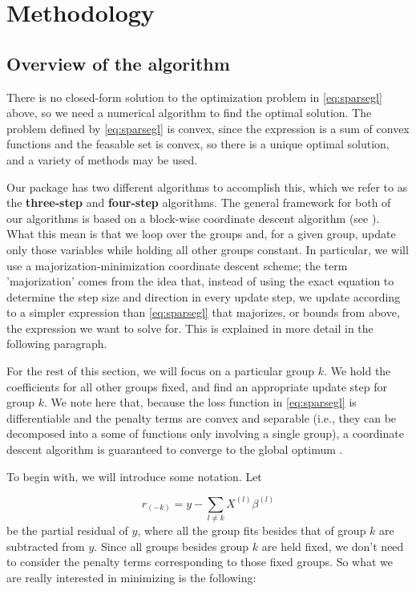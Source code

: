 \documentclass[titlepage]{article}
\begin{document}
\section{Methodology}
\label{Sec:meth}

\subsection{Overview of the algorithm}

There is no closed-form solution to the optimization problem in \autoref{eq:sparsegl} above, so we need a numerical algorithm to find the optimal solution. The problem defined by \autoref{eq:sparsegl} is convex, since the expression is a sum of convex functions and the feasable set is convex, so there is a unique optimal solution, and a variety of methods may be used.

Our package has two different algorithms to accomplish this, which we refer to as the \textbf{three-step} and \textbf{four-step} algorithms. The general framework for both of our algorithms is based on a block-wise coordinate descent algorithm (see \citep{yang2015fast, simon2013sparse}). What this mean is that we loop over the groups and, for a given group, update only those variables while holding all other groups constant. In particular, we will use a majorization-minimization coordinate descent scheme; the term 'majorization' comes from the idea that, instead of using the exact equation to determine the step size and direction in every update step, we update according to a simpler expression than \autoref{eq:sparsegl} that majorizes, or bounds from above, the expression we want to solve for. This is explained in more detail in the following paragraph.

For the rest of this section, we will focus on a particular group $k$. We hold the coefficients for all other groups fixed, and find an appropriate update step for group $k$. We note here that, because the loss function in \autoref{eq:sparsegl} is differentiable and the penalty terms are convex and separable (i.e., they can be decomposed into a some of functions only involving a single group), a coordinate descent algorithm is guaranteed to converge to the global optimum \citep{tseng2001convergence}.

To begin with, we will introduce some notation. Let 

\[
r_{(-k)} = y - \sum_{l \neq k} X^{(l)} \beta^{(l)}
\]
be the partial residual of $y$, where all the group fits besides that of group $k$ are subtracted from $y$. Since all groups besides group $k$ are held fixed, we don't need to consider the penalty terms corresponding to those fixed groups. So what we are really interested in minimizing is the following:
\end{document}
